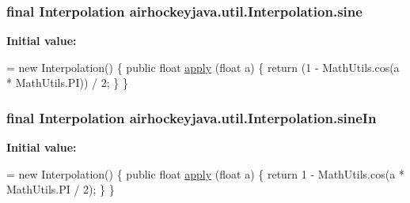 \subsubsection[{sine}]{\setlength{\rightskip}{0pt plus 5cm}final {\bf Interpolation} airhockeyjava.\+util.\+Interpolation.\+sine\hspace{0.3cm}{\ttfamily [static]}}\label{classairhockeyjava_1_1util_1_1_interpolation_a97bc23a8e964780429495f7f7befa41b}
{\bfseries Initial value\+:}
\begin{DoxyCode}
= \textcolor{keyword}{new} Interpolation() \{
        \textcolor{keyword}{public} \textcolor{keywordtype}{float} \hyperlink{classairhockeyjava_1_1util_1_1_interpolation_a21c50444fd69302dcf68703cb0d261ca}{apply} (\textcolor{keywordtype}{float} a) \{
            \textcolor{keywordflow}{return} (1 - MathUtils.cos(a * MathUtils.PI)) / 2;
        \}
    \}
\end{DoxyCode}
\hypertarget{classairhockeyjava_1_1util_1_1_interpolation_a43724e9fb801514f48b7383d8b34d5be}{}
\subsubsection[{sine\+In}]{\setlength{\rightskip}{0pt plus 5cm}final {\bf Interpolation} airhockeyjava.\+util.\+Interpolation.\+sine\+In\hspace{0.3cm}{\ttfamily [static]}}\label{classairhockeyjava_1_1util_1_1_interpolation_a43724e9fb801514f48b7383d8b34d5be}
{\bfseries Initial value\+:}
\begin{DoxyCode}
= \textcolor{keyword}{new} Interpolation() \{
        \textcolor{keyword}{public} \textcolor{keywordtype}{float} \hyperlink{classairhockeyjava_1_1util_1_1_interpolation_a21c50444fd69302dcf68703cb0d261ca}{apply} (\textcolor{keywordtype}{float} a) \{
            \textcolor{keywordflow}{return} 1 - MathUtils.cos(a * MathUtils.PI / 2);
        \}
    \}
\end{DoxyCode}
\hypertarget{classairhockeyjava_1_1util_1_1_interpolation_afd179f4560af6c61a41c58a82188d1d4}{}
